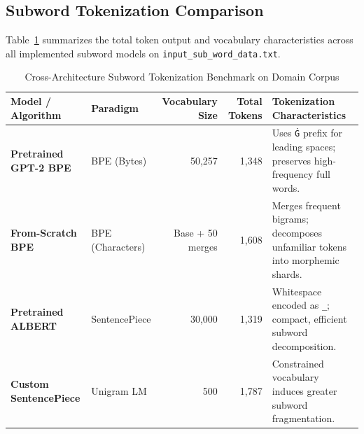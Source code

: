 \subsection{Subword Tokenization Comparison}
Table~\ref{tab:exp5_subword_summary} summarizes the total token output and vocabulary characteristics across all implemented subword models on \texttt{input\_sub\_word\_data.txt}.
\begin{table}[H]
\centering
\small
\caption{Cross-Architecture Subword Tokenization Benchmark on Domain Corpus}
\label{tab:exp5_subword_summary}
\begin{tabularx}{\textwidth}{llrrX}
\toprule
\textbf{Model / Algorithm} & \textbf{Paradigm} & \textbf{Vocabulary Size} & \textbf{Total Tokens} & \textbf{Tokenization Characteristics} \\
\midrule
\textbf{Pretrained GPT-2 BPE} & BPE (Bytes) & 50,257 & 1,348 & Uses \texttt{Ġ} prefix for leading spaces; preserves high-frequency full words. \\
\textbf{From-Scratch BPE} & BPE (Characters) & Base + 50 merges & 1,608 & Merges frequent bigrams; decomposes unfamiliar tokens into morphemic shards. \\
\textbf{Pretrained ALBERT} & SentencePiece & 30,000 & 1,319 & Whitespace encoded as \texttt{\_}; compact, efficient subword decomposition. \\
\textbf{Custom SentencePiece} & Unigram LM & 500 & 1,787 & Constrained vocabulary induces greater subword fragmentation. \\
\bottomrule
\end{tabularx}
\end{table}

